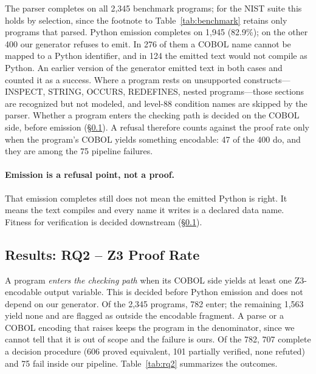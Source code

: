 \documentclass[sigconf,nonacm]{acmart}
\begin{document}
The parser completes on all 2{,}345 benchmark programs; for the NIST suite this holds by selection, since the footnote to Table~\ref{tab:benchmark} retains only programs that parsed. Python emission completes on 1{,}945 (82.9\%); on the other 400 our generator refuses to emit. In 276 of them a COBOL name cannot be mapped to a Python identifier, and in 124 the emitted text would not compile as Python. An earlier version of the generator emitted text in both cases and counted it as a success. Where a program rests on unsupported constructs---INSPECT, STRING, OCCURS, REDEFINES, nested programs---those sections are recognized but not modeled, and level-88 condition names are skipped by the parser. Whether a program enters the checking path is decided on the COBOL side, before emission (\S\ref{sec:rq2}). A refusal therefore counts against the proof rate only when the program's COBOL yields something encodable: 47 of the 400 do, and they are among the 75 pipeline failures.

\paragraph{Emission is a refusal point, not a proof.} That emission completes still does not mean the emitted Python is right. It means the text compiles and every name it writes is a declared data name. Fitness for verification is decided downstream (\S\ref{sec:rq2}).

\subsection{Results: RQ2 -- Z3 Proof Rate}\label{sec:rq2}

A program \emph{enters the checking path} when its COBOL side yields at least one Z3-encodable output variable. This is decided before Python emission and does not depend on our generator. Of the 2{,}345 programs, 782 enter; the remaining 1{,}563 yield none and are flagged as outside the encodable fragment. A parse or a COBOL encoding that raises keeps the program in the denominator, since we cannot tell that it is out of scope and the failure is ours. Of the 782, 707 complete a decision procedure (606 proved equivalent, 101 partially verified, none refuted) and 75 fail inside our pipeline. Table~\ref{tab:rq2} summarizes the outcomes.
\end{document}
